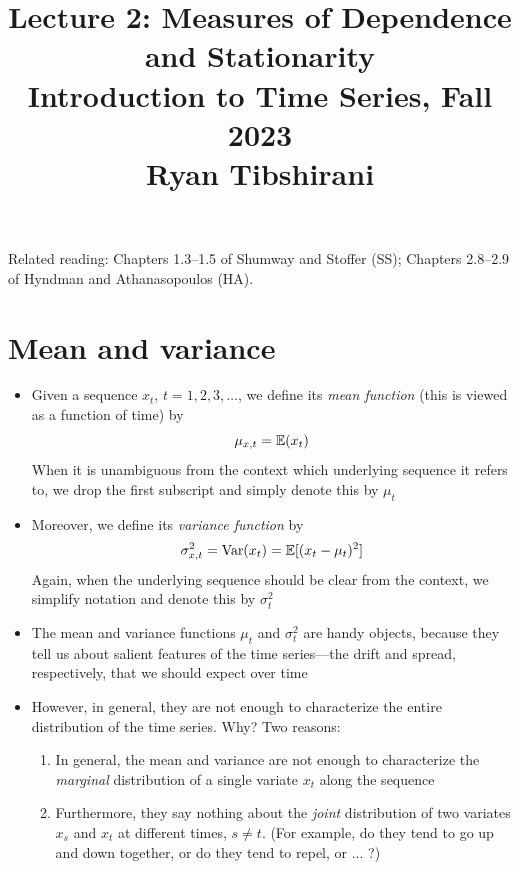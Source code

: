 \documentclass{article}
\title{Lecture 2: Measures of Dependence and Stationarity \\ \smallskip  
\large Introduction to Time Series, Fall 2023 \\ \smallskip
Ryan Tibshirani}
\date{}
\begin{document}
\maketitle
\RaggedRight
\vspace{-50pt}

Related reading: Chapters 1.3--1.5 of Shumway and Stoffer (SS); Chapters
2.8--2.9 of Hyndman and Athanasopoulos (HA).  

\section{Mean and variance}

\begin{itemize}
\item Given a sequence $x_t$, $t = 1,2,3,\dots$, we define its \emph{mean 
    function} (this is viewed as a function of time) by 
  \[
  \mu_{x,t} = \mathbb{E}(x_t)
  \]
  When it is unambiguous from the context which underlying sequence it refers
  to, we drop the first subscript and simply denote this by $\mu_t$

\item Moreover, we define its \emph{variance function} by
  \[
  \sigma^2_{x,t} = \operatorname{Var}(x_t) = \mathbb{E}[(x_t - \mu_t)^2]
  \]
  Again, when the underlying sequence should be clear from the context, we
  simplify notation and denote this by $\sigma^2_t$

\item The mean and variance functions $\mu_t$ and $\sigma^2_t$ are handy 
  objects, because they tell us about salient features of the time series---the
  drift and spread, respectively, that we should expect over time

\item However, in general, they are not enough to characterize the entire
  distribution of the time series. Why? Two reasons: 

  \begin{enumerate}
  \item In general, the mean and variance are not enough to characterize the
    \emph{marginal} distribution of a single variate $x_t$ along the sequence 

  \item Furthermore, they say nothing about the \emph{joint} distribution of
    two variates $x_s$ and $x_t$ at different times, $s \not= t$. (For example,
    do they tend to go up and down together, or do they tend to repel, or ... ?) 
  \end{enumerate}


\end{itemize}
\end{document}

